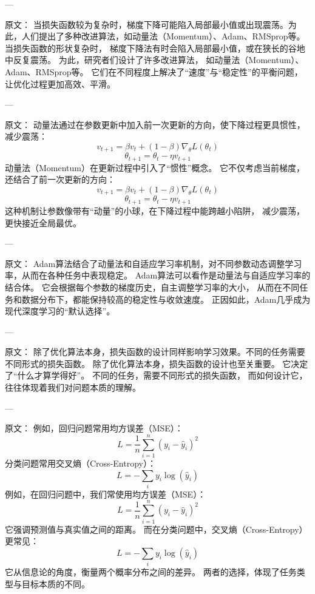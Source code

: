 ---

原文：
当损失函数较为复杂时，梯度下降可能陷入局部最小值或出现震荡。为此，人们提出了多种改进算法，如动量法（Momentum）、Adam、RMSprop等。
当损失函数的形状复杂时，  
梯度下降法有时会陷入局部最小值，或在狭长的谷地中反复震荡。  
为此，研究者们设计了许多改进算法，  
如动量法（Momentum）、Adam、RMSprop等。  
它们在不同程度上解决了“速度”与“稳定性”的平衡问题，  
让优化过程更加高效、平滑。

---

原文：
动量法通过在参数更新中加入前一次更新的方向，使下降过程更具惯性，减少震荡：
$$
v_{t+1} = \beta v_t + (1 - \beta) \nabla_\theta L(\theta_t)
$$
$$
\theta_{t+1} = \theta_t - \eta v_{t+1}
$$
动量法（Momentum）在更新过程中引入了“惯性”概念。  
它不仅考虑当前梯度，还结合了前一次更新的方向：  
$$
v_{t+1} = \beta v_t + (1 - \beta) \nabla_\theta L(\theta_t)
$$  
$$
\theta_{t+1} = \theta_t - \eta v_{t+1}
$$  
这种机制让参数像带有“动量”的小球，在下降过程中能跨越小陷阱，  
减少震荡，更快接近全局最优。

---

原文：
Adam算法结合了动量法和自适应学习率机制，对不同参数动态调整学习率，从而在各种任务中表现稳定。
Adam算法可以看作是动量法与自适应学习率的结合体。  
它会根据每个参数的梯度历史，自主调整学习率的大小，  
从而在不同任务和数据分布下，都能保持较高的稳定性与收敛速度。  
正因如此，Adam几乎成为现代深度学习的“默认选择”。

---

原文：
除了优化算法本身，损失函数的设计同样影响学习效果。不同的任务需要不同形式的损失函数。
除了优化算法本身，损失函数的设计也至关重要。  
它决定了“什么才算学得好”。  
不同的任务，需要不同形式的损失函数，  
而如何设计它，往往体现着我们对问题本质的理解。

---

原文：
例如，回归问题常用均方误差（MSE）：
$$
L = \frac{1}{n}\sum_{i=1}^{n}(y_i - \hat{y}_i)^2
$$
分类问题常用交叉熵（Cross-Entropy）：
$$
L = -\sum_{i} y_i \log(\hat{y}_i)
$$
例如，在回归问题中，我们常使用均方误差（MSE）：
$$
L = \frac{1}{n}\sum_{i=1}^{n}(y_i - \hat{y}_i)^2
$$  
它强调预测值与真实值之间的距离。  
而在分类问题中，交叉熵（Cross-Entropy）更常见：
$$
L = -\sum_{i} y_i \log(\hat{y}_i)
$$  
它从信息论的角度，衡量两个概率分布之间的差异。  
两者的选择，体现了任务类型与目标本质的不同。

